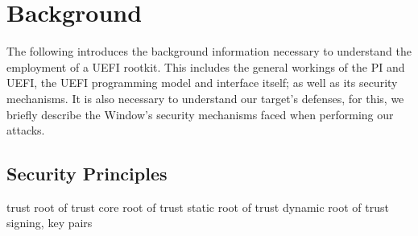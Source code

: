
\chapter{Background}

The following introduces the background information necessary to understand the employment of a \ac{UEFI} rootkit. This includes the general workings of the \acf{PI} and \ac{UEFI}, the \ac{UEFI} programming model and interface itself; as well as its security mechanisms. It is also necessary to understand our target's defenses, for this, we briefly describe the Window's security mechanisms faced when performing our attacks.

\section{Security Principles}
trust
root of trust
core root of trust
static root of trust
dynamic root of trust
signing, key pairs



